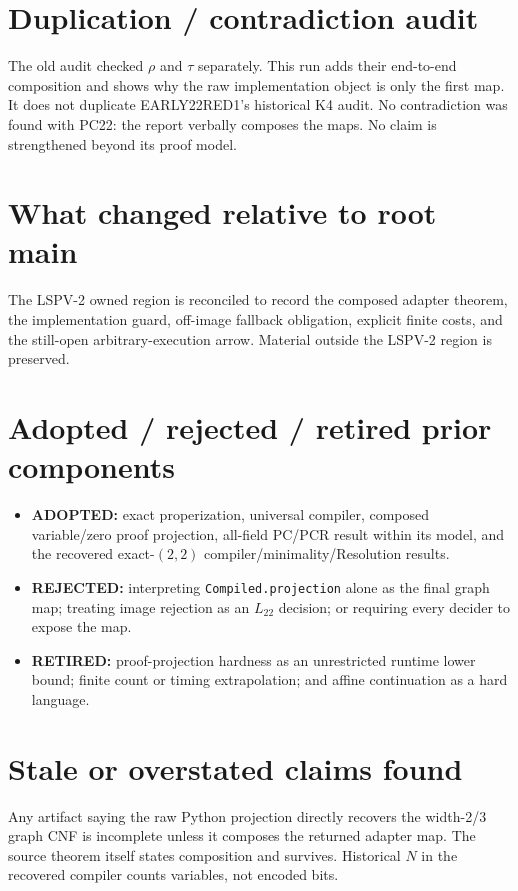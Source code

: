 \documentclass[11pt]{article}
\begin{document}
\section{Duplication / contradiction audit}
The old audit checked $\rho$ and $\tau$ separately.  This run adds their
end-to-end composition and shows why the raw implementation object is only the
first map.  It does not duplicate EARLY22RED1's historical K4 audit.  No
contradiction was found with PC22: the report verbally composes the maps.  No
claim is strengthened beyond its proof model.

\section{What changed relative to root main}
The LSPV-2 owned region is reconciled to record the composed adapter theorem,
the implementation guard, off-image fallback obligation, explicit finite
costs, and the still-open arbitrary-execution arrow.  Material outside the
LSPV-2 region is preserved.

\section{Adopted / rejected / retired prior components}
\begin{itemize}[leftmargin=*]
\item \textbf{ADOPTED:} exact properization, universal compiler, composed
variable/zero proof projection, all-field PC/PCR result within its model,
and the recovered exact-$(2,2)$ compiler/minimality/Resolution results.
\item \textbf{REJECTED:} interpreting \texttt{Compiled.projection} alone as
the final graph map; treating image rejection as an $L_{22}$ decision;
or requiring every decider to expose the map.
\item \textbf{RETIRED:} proof-projection hardness as an unrestricted runtime
lower bound; finite count or timing extrapolation; and affine continuation
as a hard language.
\end{itemize}

\section{Stale or overstated claims found}
Any artifact saying the raw Python projection directly recovers the
width-2/3 graph CNF is incomplete unless it composes the returned adapter map.
The source theorem itself states composition and survives.  Historical $N$
in the recovered compiler counts variables, not encoded bits.
\end{document}
